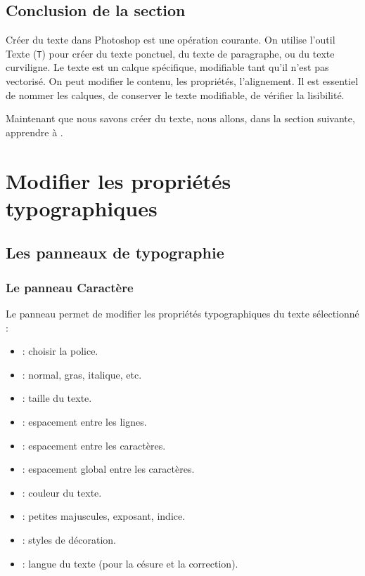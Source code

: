 \subsection*{Conclusion de la section}

Créer du texte dans Photoshop est une opération courante. On utilise l'outil Texte (\texttt{T}) pour créer du texte ponctuel, du texte de paragraphe, ou du texte curviligne. Le texte est un calque spécifique, modifiable tant qu'il n'est pas vectorisé. On peut modifier le contenu, les propriétés, l'alignement. Il est essentiel de nommer les calques, de conserver le texte modifiable, de vérifier la lisibilité.

Maintenant que nous savons créer du texte, nous allons, dans la section suivante, apprendre à .

\section{Modifier les propriétés typographiques}

\subsection{Les panneaux de typographie}

\subsubsection{Le panneau Caractère}

Le panneau  permet de modifier les propriétés typographiques du texte sélectionné :

\begin{itemize}
    \item {} : choisir la police.
    \item {} : normal, gras, italique, etc.
    \item {} : taille du texte.
    \item {} : espacement entre les lignes.
    \item {} : espacement entre les caractères.
    \item {} : espacement global entre les caractères.
    \item {} : couleur du texte.
    \item {} : petites majuscules, exposant, indice.
    \item {} : styles de décoration.
    \item {} : langue du texte (pour la césure et la correction).
\end{itemize}

